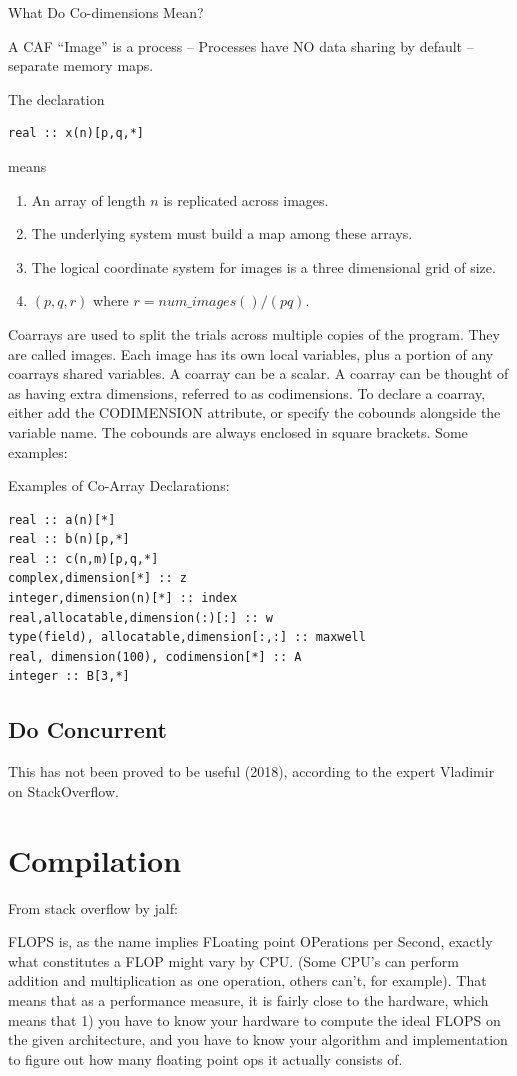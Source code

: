 \documentclass[11pt]{book} %
\begin{document}
What Do Co-dimensions Mean?

A CAF “Image” is a process – Processes have NO data sharing by default – separate memory maps.

The declaration
\begin{verbatim}
real :: x(n)[p,q,*]
\end{verbatim}
means
\begin{enumerate}
\item An array of length $n$ is replicated across images.
\item The underlying system must build a map among these arrays.
\item The logical coordinate system for images is a three dimensional grid of size.
\item $(p,q,r)$ where $r=num\_images()/(pq)$.
\end{enumerate}

Coarrays are used to split the trials across multiple copies of the program. They are called images. Each image has its own local variables, plus a portion of any coarrays shared variables. A coarray can be a scalar. A coarray can be thought of as having extra dimensions, referred to as codimensions. To declare a coarray, either add the CODIMENSION attribute, or specify the cobounds alongside the variable name. The cobounds are always enclosed in square brackets. Some examples:

Examples of Co-Array Declarations:
\begin{verbatim}
real :: a(n)[*]
real :: b(n)[p,*]
real :: c(n,m)[p,q,*]
complex,dimension[*] :: z
integer,dimension(n)[*] :: index
real,allocatable,dimension(:)[:] :: w
type(field), allocatable,dimension[:,:] :: maxwell
real, dimension(100), codimension[*] :: A
integer :: B[3,*]
\end{verbatim}

\section{Do Concurrent}

This has not been proved to be useful (2018), according to the expert Vladimir on StackOverflow.


\chapter{Compilation}

From stack overflow by jalf:

FLOPS is, as the name implies FLoating point OPerations per Second, exactly what constitutes a FLOP might vary by CPU. (Some CPU's can perform addition and multiplication as one operation, others can't, for example). That means that as a performance measure, it is fairly close to the hardware, which means that 1) you have to know your hardware to compute the ideal FLOPS on the given architecture, and you have to know your algorithm and implementation to figure out how many floating point ops it actually consists of.
\end{document}
